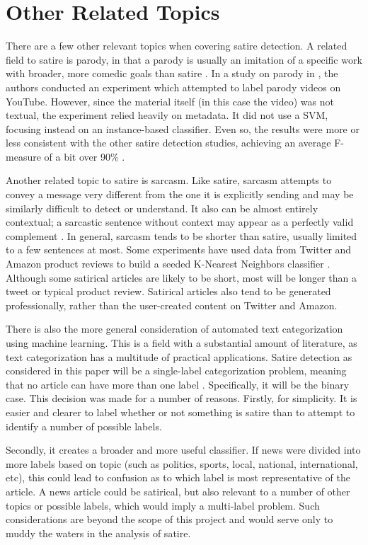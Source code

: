 \documentclass [12 pt] {report}
\begin{document}
\section{Other Related Topics}
There are a few other relevant topics when covering satire detection. A related field to satire is parody, in that a parody is usually an imitation of a specific work with broader, more comedic goals than satire \cite{digHumanities}. In a study on parody in \cite{digHumanities}, the authors conducted an experiment which attempted to label parody videos on YouTube. However, since the material itself (in this case the video) was not textual, the experiment relied heavily on metadata. It did not use a SVM, focusing instead on an instance-based classifier. Even so, the results were more or less consistent with the other satire detection studies, achieving an average F-measure of a bit over 90\% \cite{digHumanities}.

Another related topic to satire is sarcasm. Like satire, sarcasm attempts to convey a message very different from the one it is explicitly sending and may be similarly difficult to detect or understand. It also can be almost entirely contextual; a sarcastic sentence without context may appear as a perfectly valid complement \cite{twitterSarcasm}. In general, sarcasm tends to be shorter than satire, usually limited to a few sentences at most. Some experiments have used data from Twitter and Amazon product reviews to build a seeded K-Nearest Neighbors classifier \cite{twitterSarcasm}. Although some satirical articles are likely to be short, most will be longer than a tweet or typical product review. Satirical articles also tend to be generated professionally, rather than the user-created content on Twitter and Amazon.

There is also the more general consideration of automated text categorization using machine learning. This is a field with a substantial amount of literature, as text categorization has a multitude of practical applications. Satire detection as considered in this paper will be a single-label categorization problem, meaning that no article can have more than one label \cite{Sebastiani}. Specifically, it will be the binary case. This decision was made for a number of reasons. Firstly, for simplicity. It is easier and clearer to label whether or not something is satire than to attempt to identify a number of possible labels.

Secondly, it creates a broader and more useful classifier. If news were divided into more labels based on topic (such as politics, sports, local, national, international, etc), this could lead to confusion as to which label is most representative of the article. A news article could be satirical, but also relevant to a number of other topics or possible labels, which would imply a multi-label problem. Such considerations are beyond the scope of this project and would serve only to muddy the waters in the analysis of satire. 
\end{document}
